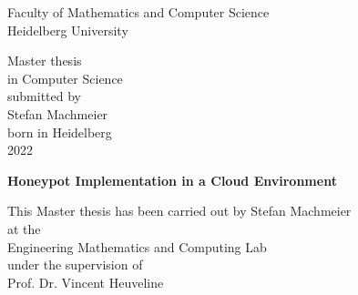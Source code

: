 \thispagestyle{empty}
\begin{center}
  \renewcommand{\baselinestretch}{2.00}
  \Large%
  Faculty of Mathematics and Computer Science\\
  \large Heidelberg University
  \par\vfill\normalfont
  Master thesis\\
  in Computer Science\\
  submitted by\\
  Stefan Machmeier\\
  born in Heidelberg\\
  2022
\end{center}
\newpage

\thispagestyle{empty}
\begin{center}
  \renewcommand{\baselinestretch}{2.00}
  \Large\bfseries%
    Honeypot Implementation in a Cloud Environment
  \par
  \vfill
  \large\normalfont
  This Master thesis has been carried out by Stefan Machmeier\\
  at the\\
  Engineering Mathematics and Computing Lab\\
  under the supervision of\\
  Prof. Dr. Vincent Heuveline
\end{center}\par
\vspace{5\baselineskip}

\renewcommand{\baselinestretch}{1.00}\normalsize
